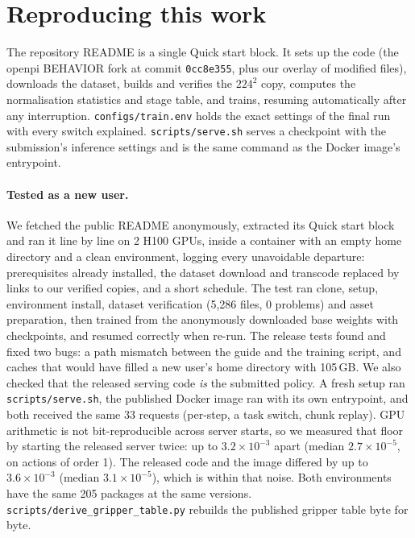 \documentclass[10pt]{article}
\begin{document}
\section{Reproducing this work}
\label{sec:repro}
The repository README is a single Quick start block. It sets up the code (the openpi BEHAVIOR fork at commit
\texttt{0cc8e355}, plus our overlay of modified files), downloads the dataset, builds and verifies the $224^2$ copy,
computes the normalisation statistics and stage table, and trains, resuming automatically after any interruption.
\texttt{configs/train.env} holds the exact settings of the final run with every switch explained.
\texttt{scripts/serve.sh} serves a checkpoint with the submission's inference settings and is the same command as the
Docker image's entrypoint.

\paragraph{Tested as a new user.} We fetched the public README anonymously, extracted its Quick start block and ran it
line by line on 2 H100 GPUs, inside a container with an empty home directory and a clean environment, logging every
unavoidable departure: prerequisites already installed, the dataset download and transcode replaced by links to our
verified copies, and a short schedule. The test ran clone, setup, environment install, dataset verification (5{,}286
files, 0 problems) and asset preparation, then trained from the anonymously downloaded base weights with checkpoints,
and resumed correctly when re-run. The release tests found and fixed two bugs: a path mismatch between the guide and the training script, and caches that would have
filled a new user's home directory with 105\,GB. We also checked that the released serving code \emph{is} the submitted policy. A fresh setup ran \texttt{scripts/serve.sh}, the published Docker image ran with its own entrypoint, and both received the same 33 requests (per-step, a task switch, chunk replay). GPU arithmetic is not bit-reproducible across server starts, so we measured that floor by starting the released server twice: up to $3.2\times10^{-3}$ apart (median $2.7\times10^{-5}$, on actions of order 1). The released code and the image differed by up to $3.6\times10^{-3}$ (median $3.1\times10^{-5}$), which is within that noise. Both environments have the same 205 packages at the same versions. \texttt{scripts/derive\_gripper\_table.py} rebuilds the published gripper table byte for byte.
\end{document}
